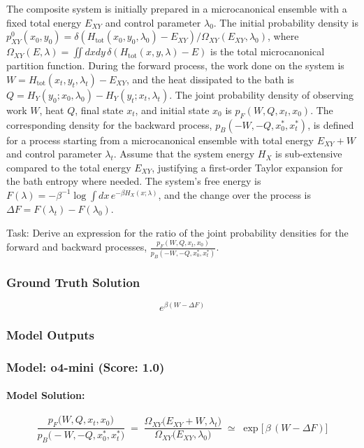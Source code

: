 \documentclass[10pt]{article}
\begin{document}
The composite system is initially prepared in a microcanonical ensemble with a fixed total energy $E_{XY}$ and control parameter $\lambda_0$. The initial probability density is $p_{XY}^0(x_0, y_0) = \delta(H_{\text{tot}}(x_0, y_0, \lambda_0) - E_{XY}) / \Omega_{XY}(E_{XY}, \lambda_0)$, where $\Omega_{XY}(E, \lambda) = \iint dx dy \, \delta(H_{\text{tot}}(x, y, \lambda) - E)$ is the total microcanonical partition function. During the forward process, the work done on the system is $W = H_{\text{tot}}(x_t, y_t, \lambda_t) - E_{XY}$, and the heat dissipated to the bath is $Q = H_Y(y_0; x_0, \lambda_0) - H_Y(y_t; x_t, \lambda_t)$. The joint probability density of observing work $W$, heat $Q$, final state $x_t$, and initial state $x_0$ is $p_F(W, Q, x_t, x_0)$. The corresponding density for the backward process, $p_B(-W, -Q, x_0^*, x_t^*)$, is defined for a process starting from a microcanonical ensemble with total energy $E_{XY}+W$ and control parameter $\lambda_t$. Assume that the system energy $H_X$ is sub-extensive compared to the total energy $E_{XY}$, justifying a first-order Taylor expansion for the bath entropy where needed. The system's free energy is $F(\lambda) = - \beta^{-1} \log \int dx \, e^{-\beta H_X(x; \lambda)}$, and the change over the process is $\Delta F = F(\lambda_t) - F(\lambda_0)$.

Task:
Derive an expression for the ratio of the joint probability densities for the forward and backward processes, $\frac{p_F(W, Q, x_t, x_0)}{p_B(-W, -Q, x_0^*, x_t^*)}$.

\subsubsection*{Ground Truth Solution}
\[ \boxed{e^{\beta(W - \Delta F)}} \]

\subsubsection*{Model Outputs}
\subsubsection*{Model: o4-mini (Score: 1.0)}
\paragraph*{Model Solution:}
\[ \frac{p_F\bigl(W,Q,x_t,x_0\bigr)}{p_B\bigl(-W,-Q,x_0^*,x_t^*\bigr)}
\;=\;
\frac{\Omega_{XY}\bigl(E_{XY}+W,\lambda_t\bigr)}
     {\Omega_{XY}\bigl(E_{XY},\lambda_0\bigr)}
\;\simeq\;
\exp\!\bigl[\,\beta\,(W-\Delta F)\bigr] \]
\end{document}
